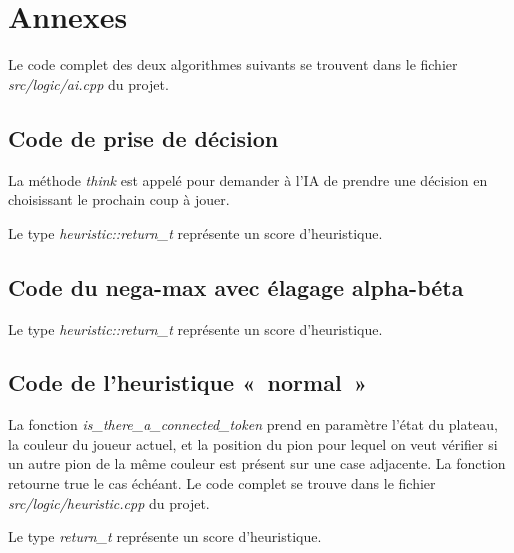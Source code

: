 \chapter{Annexes}

Le code complet des deux algorithmes suivants se trouvent dans le fichier \emph{src/logic/ai.cpp} du projet.

\section{Code de prise de décision}\label{src:think}



La méthode \emph{think} est appelé pour demander à l'IA de prendre une décision en choisissant le prochain coup à
jouer.

Le type \emph{heuristic::return\_t} représente un score d'heuristique.

\section{Code du nega-max avec élagage alpha-béta}\label{src:negamax}



Le type \emph{heuristic::return\_t} représente un score d'heuristique.

\newpage
\section{Code de l'heuristique « normal »}\label{src:heuristic_normal}



La fonction \emph{is_there_a_connected_token} prend en paramètre l'état du plateau, la couleur du joueur actuel,
et la position du pion pour lequel on veut vérifier si un autre pion de la même couleur est présent sur une case adjacente.
La fonction retourne true le cas échéant.
Le code complet se trouve dans le fichier \emph{src/logic/heuristic.cpp} du projet.

Le type \emph{return\_t} représente un score d'heuristique.

